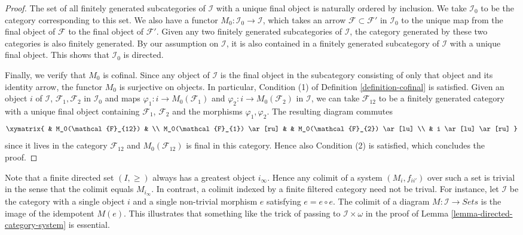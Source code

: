 \begin{proof}
\medskip\noindent
The set of all finitely generated subcategories of $\mathcal{I}$
with a unique final object is naturally ordered by inclusion.
We take $\mathcal{I}_0$ to be the category corresponding
to this set. We also have a functor
$M_0 : \mathcal{I}_0 \to \mathcal{I}$, which takes an
arrow $\mathcal{F} \subset \mathcal{F'}$ in
$\mathcal{I}_0$ to the unique map from the final object of
$\mathcal{F}$ to the final object of $\mathcal{F}'$.
Given any two finitely generated subcategories of
$\mathcal{I}$, the category generated by these two categories is
also finitely generated. By our assumption on $\mathcal{I}$, it is
also contained in a finitely generated subcategory of $\mathcal{I}$
with a unique final object. This shows that $\mathcal{I}_0$ is directed.

\medskip\noindent
Finally, we verify that $M_0$ is cofinal. Since any
object of $\mathcal{I}$ is the final object in the subcategory
consisting of only that object and its identity arrow, the functor
$M_0$ is surjective on objects. In particular, Condition (1) of
Definition \ref{definition-cofinal} is satisfied. Given
an object $i$ of $\mathcal{I}$, $\mathcal{F}_1, \mathcal{F}_2$ in
$\mathcal{I}_0$ and maps $\varphi_1 : i \to M_0(\mathcal{F}_1)$
and $\varphi_2 : i \to M_0(\mathcal{F}_2)$ in
$\mathcal{I}$, we can take $\mathcal{F}_{12}$ to be a finitely
generated category with a unique final object containing
$\mathcal{F}_1$, $\mathcal{F}_2$ and the morphisms $\varphi_1, \varphi_2$.
The resulting diagram commutes
$$
\xymatrix{
& M_0(\mathcal{F}_{12}) & \\
M_0(\mathcal{F}_{1}) \ar[ru] & & M_0(\mathcal{F}_{2}) \ar[lu] \\
& i \ar[lu] \ar[ru]
}
$$
since it lives in the category $\mathcal{F}_{12}$ and
$M_0(\mathcal{F}_{12})$ is final in
this category. Hence also Condition (2) is satisfied, which concludes
the proof.
\end{proof}

\begin{remark}
\label{remark-trick-needed}
Note that a finite directed set $(I, \geq)$ always has a greatest object
$i_\infty$. Hence any colimit of a system $(M_i, f_{ii'})$ over such a set
is trivial in the sense that the colimit equals $M_{i_\infty}$. In contrast,
a colimit indexed by a finite filtered category need not
be trival. For instance, let $\mathcal{I}$ be the category with a single object
$i$ and a single non-trivial morphism $e$ satisfying $e = e \circ e$. The
colimit of a diagram $M : \mathcal{I} \to Sets$ is the image of the
idempotent $M(e)$. This illustrates that something like the trick of passing
to $\mathcal{I}\times \omega$ in the proof of
Lemma \ref{lemma-directed-category-system} is essential.
\end{remark}

